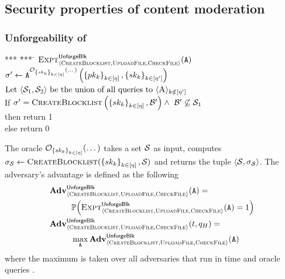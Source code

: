 \subsection{Security properties of content moderation}
\label{sec:defn:content_mod}
\subsubsection{Unforgeability of \blklistToken}
%

		\begin{center}
	\begin{minipage}{0.5\columnwidth}
		\begin{tabbing}
			*** \= *** \= \kill
			$\Experiment{\unforgeBlocklistLabel}{\contentModSchemeDefn}(\adversary)$ \\
			\> $\genericSigAlt \assign \adversary^{\genericOracle_{\setOfAuditorPrivkeys}(\dots)}\left(\setOfAuditorPubkeys, \setOfDishonestAuditorPrivkeys\right)$\\
			\> $\text{Let} ~\langle\genericSetVar[1], \genericSetVar[2]\rangle ~\text{be the union of all queries to} ~\langle \auditor \rangle_{\auditorIdx \notin \nats[\numDishonestAuditors]}$\\
	        \> If $\genericSigAlt =  \createBlocklist\left(\setOfAuditorPrivkeys, \blocklist' \right) 
			\land ~\blocklist' \not \subseteq \genericSetVar[1]$\\
			\> \> then return 1\\
            \> \> else return 0
		\end{tabbing}
	\end{minipage}
	\end{center}	


The oracle $\genericOracle_{\setOfAuditorPrivkeys}(\dots)$ takes a set $\genericSetVar$ as input, computes $\genericSig[\genericSetVar] \assign \createBlocklist(\setOfAuditorPrivkeys, \genericSetVar)$ and returns the tuple $\langle \genericSetVar, \genericSig[\genericSetVar] \rangle$. 
The adversary's advantage is defined as the following 
\begin{align*}
	& \Advantage{\unforgeBlocklistLabel}{\contentModSchemeDefn}(\adversary)= \\ 
	& ~~\qquad \prob{\Experiment{\unforgeBlocklistLabel}{\contentModSchemeDefn}(\adversary) = 
		1} \\
	& \Advantage{\unforgeBlocklistLabel}{\contentModSchemeDefn}(\timeBound, \oracleQueries) = \\
	& ~~\qquad \max_{\indcpaAdversary} \Advantage{\unforgeBlocklistLabel}{\contentModSchemeDefn}(\indcpaAdversary)
\end{align*}
where the maximum is taken over all adversaries \adversary that run in time \timeBound and oracle queries \numOracleQueries.




